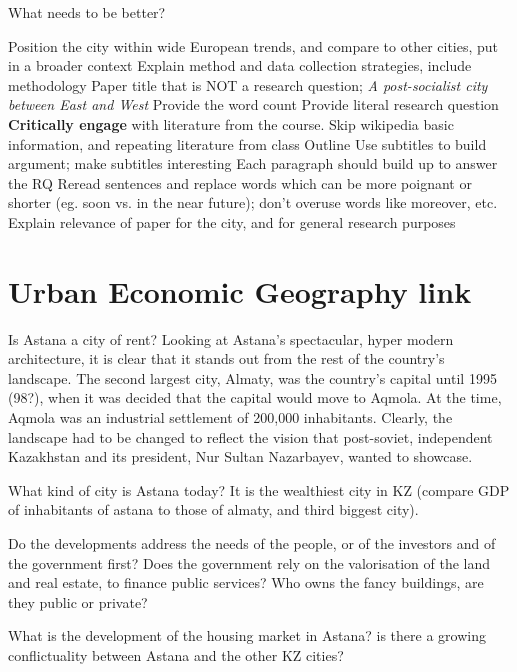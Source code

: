 \documentclass{article}
\begin{document}
What needs to be better? 

\begin{outline}
	\1 Position the city within wide European trends, and compare to other cities, put in a broader context
	\1 Explain method and data collection strategies, include methodology
	\1 Paper title that is NOT a research question; \textit{A post-socialist city between East and West}
	\1 Provide the word count
	\1 Provide literal research question
	\1 \textbf{Critically engage} with literature from the course. Skip wikipedia basic information, and repeating literature from class
	\1 Outline
		\2 Use subtitles to build argument; make subtitles interesting
		\2 Each paragraph should build up to answer the RQ
	\1 Reread sentences and replace words which can be more poignant or shorter (eg. soon vs. in the near future); don't overuse words like moreover, etc.
	\1 Explain relevance of paper for the city, and for general research purposes
\end{outline}


\section{Urban Economic Geography link}

Is Astana a city of rent? Looking at Astana's spectacular, hyper modern architecture, it is clear that it stands out from the rest of the country's landscape. The second largest city, Almaty, was the country's capital until 1995 (98?), when it was decided that the capital would move to Aqmola. At the time, Aqmola was an industrial settlement of 200,000 inhabitants. Clearly, the landscape had to be changed to reflect the vision that post-soviet, independent Kazakhstan and its president, Nur Sultan Nazarbayev, wanted to showcase. 

What kind of city is Astana today? It is the wealthiest city in KZ (compare GDP of inhabitants of astana to those of almaty, and third biggest city). 

Do the developments address the needs of the people, or of the investors and of the government first?
Does the government rely on the valorisation of the land and real estate, to finance public services? Who owns the fancy buildings, are they public or private?

What is the development of the housing market in Astana?
is there a growing conflictuality between Astana and the other KZ cities?
\end{document}

